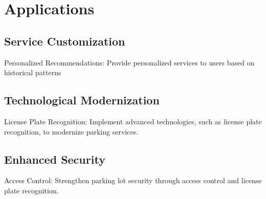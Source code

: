 \documentclass{article}
\begin{document}
\section{Applications}
\subsection{Service Customization}
Personalized Recommendations: Provide personalized services to users based on historical patterns
\subsection{Technological Modernization}
License Plate Recognition: Implement advanced technologies, such as license plate recognition, to modernize parking services.

\subsection{Enhanced Security}
Access Control: Strengthen parking lot security through access control and license plate recognition.
\end{document}
